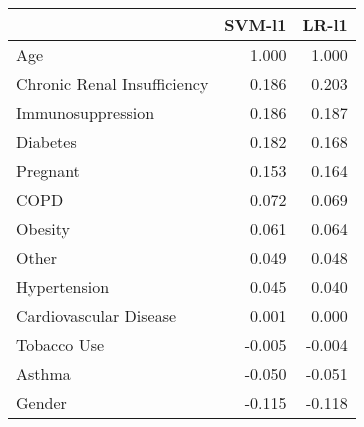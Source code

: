 \begin{tabular}{lrr}
\toprule
{} &  SVM-l1 &  LR-l1 \\
\midrule
Age                         &   1.000 &  1.000 \\
Chronic Renal Insufficiency &   0.186 &  0.203 \\
Immunosuppression           &   0.186 &  0.187 \\
Diabetes                    &   0.182 &  0.168 \\
Pregnant                    &   0.153 &  0.164 \\
COPD                        &   0.072 &  0.069 \\
Obesity                     &   0.061 &  0.064 \\
Other                       &   0.049 &  0.048 \\
Hypertension                &   0.045 &  0.040 \\
Cardiovascular Disease      &   0.001 &  0.000 \\
Tobacco Use                 &  -0.005 & -0.004 \\
Asthma                      &  -0.050 & -0.051 \\
Gender                      &  -0.115 & -0.118 \\
\bottomrule
\end{tabular}
